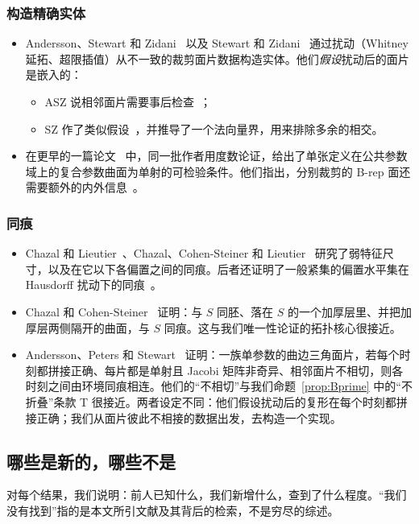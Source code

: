 \subsubsection*{构造精确实体}
\begin{itemize}
\item Andersson、Stewart 和 Zidani~\cite{ASZ07} 以及 Stewart 和 Zidani~\cite{SZ08} 通过扰动（Whitney 延拓、超限插值）从不一致的裁剪面片数据构造实体。他们\emph{假设}扰动后的面片是嵌入的：
  \begin{itemize}
  \item ASZ 说相邻面片需要事后检查~\cite[pp.~819--820]{ASZ07}；
  \item SZ 作了类似假设~\cite[p.~188]{SZ08}，并推导了一个法向量界，用来排除多余的相交。
  \end{itemize}
\item 在更早的一篇论文~\cite{ASZ06} 中，同一批作者用度数论证，给出了单张定义在公共参数域上的复合参数曲面为单射的可检验条件。他们指出，分别裁剪的 B-rep 面还需要额外的内外信息~\cite[\S3.7]{ASZ06}。
\end{itemize}

\subsubsection*{同痕}
\begin{itemize}
\item Chazal 和 Lieutier~\cite{ChazalLieutier07}、Chazal、Cohen-Steiner 和 Lieutier~\cite{CCSL09dcg} 研究了弱特征尺寸，以及在它以下各偏置之间的同痕。后者还证明了一般紧集的偏置水平集在 Hausdorff 扰动下的同痕~\cite[Thms.~4.2,~4.3]{CCSL09cg}。
\item Chazal 和 Cohen-Steiner~\cite[Thm.~2.1]{CCS05} 证明：与 $S$ 同胚、落在 $S$ 的一个加厚层里、并把加厚层两侧隔开的曲面，与 $S$ 同痕。这与我们唯一性论证的拓扑核心很接近。
\item Andersson、Peters 和 Stewart~\cite[Thm.~1]{APS00} 证明：一族单参数的曲边三角面片，若每个时刻都拼接正确、每片都是单射且 Jacobi 矩阵非奇异、相邻面片不相切，则各时刻之间由环境同痕相连。他们的``不相切''与我们命题~\ref{prop:Bprime} 中的``不折叠''条款 T 很接近。两者设定不同：他们假设扰动后的复形在每个时刻都拼接正确；我们从面片彼此不相接的数据出发，去构造一个实现。
\end{itemize}

\subsection{哪些是新的，哪些不是}
对每个结果，我们说明：前人已知什么，我们新增什么，查到了什么程度。``我们没有找到''指的是本文所引文献及其背后的检索，不是穷尽的综述。

